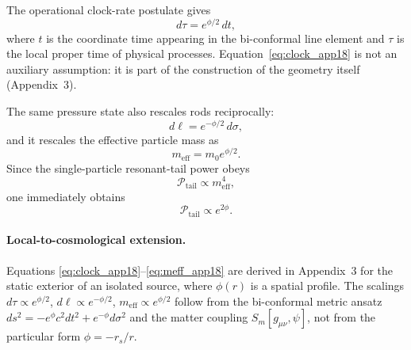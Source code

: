 \documentclass[11pt]{article}
\begin{document}
The operational clock-rate postulate gives
\begin{equation}
  d\tau = e^{\phi/2}\,dt,
  \label{eq:clock_app18}
\end{equation}
where $t$ is the coordinate time appearing in the bi-conformal line
element and $\tau$ is the local proper time of physical processes.
Equation~\eqref{eq:clock_app18} is not an auxiliary assumption: it is part
of the construction of the geometry itself (Appendix~3).

The same pressure state also rescales rods reciprocally:
\begin{equation}
  d\ell = e^{-\phi/2}\,d\sigma,
  \label{eq:rod_app18}
\end{equation}
and it rescales the effective particle mass as
\begin{equation}
  m_{\mathrm{eff}} = m_0 e^{\phi/2}.
  \label{eq:meff_app18}
\end{equation}
Since the single-particle resonant-tail power obeys
\begin{equation}
  \mathcal{P}_{\mathrm{tail}} \propto m_{\mathrm{eff}}^4,
  \label{eq:Ptail_scaling_app18}
\end{equation}
one immediately obtains
\begin{equation}
  \mathcal{P}_{\mathrm{tail}} \propto e^{2\phi}.
  \label{eq:Ptail_phi_app18}
\end{equation}

\paragraph{Local-to-cosmological extension.}
Equations \eqref{eq:clock_app18}--\eqref{eq:meff_app18} are derived in
Appendix~3 for the static exterior of an isolated source, where $\phi(r)$
is a spatial profile.  The scalings $d\tau\propto e^{\phi/2}$,
$d\ell\propto e^{-\phi/2}$, $m_{\mathrm{eff}}\propto e^{\phi/2}$ follow
from the bi-conformal metric ansatz
$ds^2=-e^{\phi}c^2dt^2+e^{-\phi}d\sigma^2$ and the matter coupling
$S_m[g_{\mu\nu},\psi]$, not from the particular form $\phi=-r_s/r$.
\end{document}

